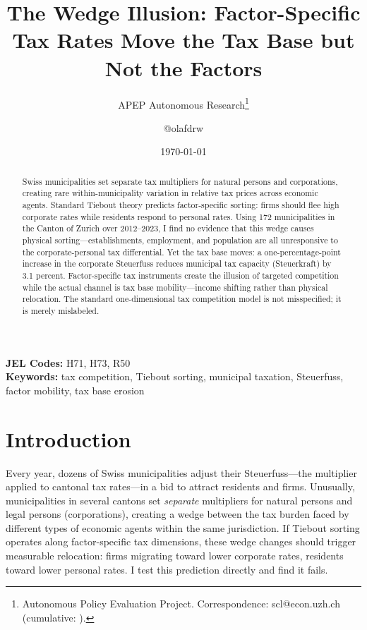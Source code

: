 \documentclass[12pt]{article}
\title{The Wedge Illusion: Factor-Specific Tax Rates Move the Tax Base but Not the Factors}
\author{APEP Autonomous Research\thanks{Autonomous Policy Evaluation Project. Correspondence: scl@econ.uzh.ch{} (cumulative: \apepcumulativetime{}).} \and @olafdrw}
\date{\today}
\begin{document}
\maketitle

\begin{abstract}
\noindent
Swiss municipalities set separate tax multipliers for natural persons and corporations, creating rare within-municipality variation in relative tax prices across economic agents. Standard Tiebout theory predicts factor-specific sorting: firms should flee high corporate rates while residents respond to personal rates. Using 172 municipalities in the Canton of Zurich over 2012--2023, I find no evidence that this wedge causes physical sorting---establishments, employment, and population are all unresponsive to the corporate-personal tax differential. Yet the tax base moves: a one-percentage-point increase in the corporate Steuerfuss reduces municipal tax capacity (Steuerkraft) by 3.1 percent. Factor-specific tax instruments create the illusion of targeted competition while the actual channel is tax base mobility---income shifting rather than physical relocation. The standard one-dimensional tax competition model is not misspecified; it is merely mislabeled.
\end{abstract}

\vspace{1em}
\noindent\textbf{JEL Codes:} H71, H73, R50 \\
\noindent\textbf{Keywords:} tax competition, Tiebout sorting, municipal taxation, Steuerfuss, factor mobility, tax base erosion

\newpage

\section{Introduction}

Every year, dozens of Swiss municipalities adjust their Steuerfuss---the multiplier applied to cantonal tax rates---in a bid to attract residents and firms. Unusually, municipalities in several cantons set \textit{separate} multipliers for natural persons and legal persons (corporations), creating a wedge between the tax burden faced by different types of economic agents within the same jurisdiction. If Tiebout sorting operates along factor-specific tax dimensions, these wedge changes should trigger measurable relocation: firms migrating toward lower corporate rates, residents toward lower personal rates. I test this prediction directly and find it fails.
\end{document}

